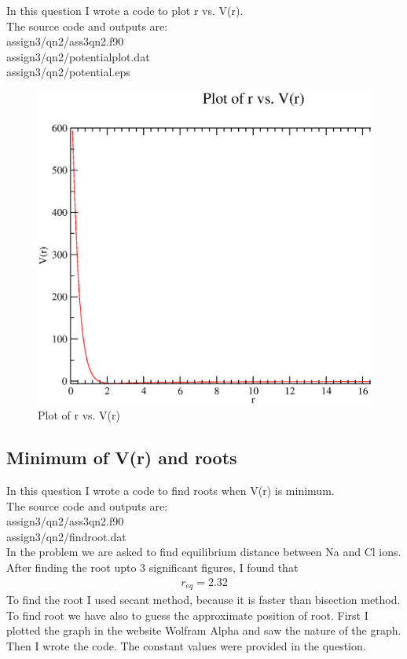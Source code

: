 \documentclass[11pt,a4paper,english]{article}
\newcommand{\beqa}{\begin{eqnarray}}
\newcommand{\eeqa}{\end{eqnarray}}
\begin{document}
In this question I wrote a code to plot r vs. V(r).\\
The source code and outputs are:\\
assign3/qn2/ass3qn2.f90\\
assign3/qn2/potentialplot.dat\\
assign3/qn2/potential.eps\\

 	
	\begin{figure}[h!]
	\centering
	\includegraphics[width=1.0\textwidth,left]{./images/potential.eps}
	\caption{Plot of r vs. V(r) }
	\end{figure}
 	
\clearpage

\subsection{Minimum of V(r) and roots}
In this question I wrote a code to find roots when V(r) is minimum.\\
The source code and outputs are:\\
assign3/qn2/ass3qn2.f90\\
assign3/qn2/findroot.dat\\

In the problem we are asked to find equilibrium distance between Na and Cl ions.
After finding the root upto 3 significant figures, I found that 
\beqa r_{eq} = 2.32
\eeqa
To find the root I used secant method, because it is faster than bisection method.
To find root we have also to guess the approximate position of root. First I plotted 
the graph in the website Wolfram Alpha and saw the nature of the graph.
Then I wrote the code. The constant values were provided in the question.
\end{document}
